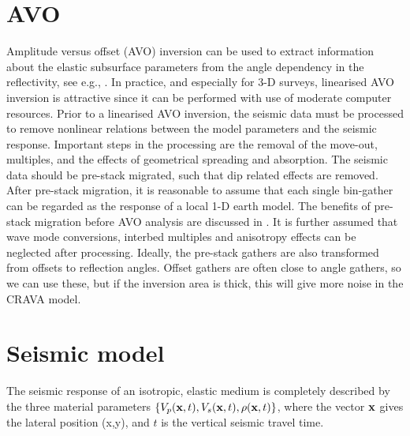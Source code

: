\section{AVO}
Amplitude versus offset (AVO) inversion can be used to extract
information about the elastic subsurface parameters from the angle
dependency in the reflectivity, see e.g.,
\cite{hamp90,lort93,pan94,bula96b}. In practice, and especially for
3-D surveys, linearised AVO inversion is attractive since it can be
performed with use of moderate computer resources. Prior to a
linearised AVO inversion, the seismic data must be processed to remove
nonlinear relations between the model parameters and the seismic
response. Important steps in the processing are the removal of the
move-out, multiples, and the effects of geometrical spreading and
absorption. The seismic data should be pre-stack migrated, such that
dip related effects are removed. After pre-stack migration, it is
reasonable to assume that each single bin-gather can be regarded as
the response of a local 1-D earth model. The benefits of pre-stack
migration before AVO analysis are discussed in
\cite{brow92,mosh96,bula2001d}. It is further assumed that wave mode
conversions, interbed multiples and  anisotropy effects can be
neglected after processing.  Ideally, the pre-stack gathers are also
transformed from offsets to reflection angles. Offset gathers are often close
to angle gathers, so we can use these, but if the inversion area is
thick, this will give more noise in the CRAVA model.

\section{Seismic model}

The seismic response of an isotropic, elastic medium is completely
described by the three material parameters $\{V_p(\mathbf{x},t),
V_s(\mathbf{x},t), \rho(\mathbf{x},t)\}$, where the vector $\mathbf{x}$
gives the lateral position (x,y), and $t$ is the vertical seismic
travel time.

